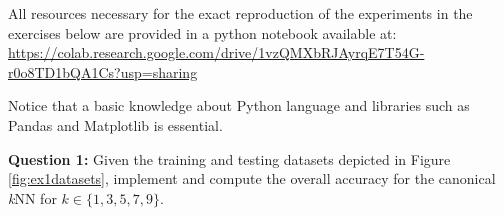 All resources necessary for the exact reproduction of the experiments in the exercises below are provided in a python notebook available at: \url{https://colab.research.google.com/drive/1vzQMXbRJAyrqE7T54G-r0o8TD1bQA1Cs?usp=sharing} 

\vspace{0.2cm}

Notice that a basic knowledge about Python language and libraries such as Pandas and Matplotlib is essential.

\vspace{0.2cm}

\noindent \textbf{Question 1:}  Given the training and testing datasets depicted in Figure \ref{fig:ex1datasets}, implement and compute the overall accuracy for the canonical \textit{k}NN for $k \in \{1, 3, 5, 7, 9\}$. 

